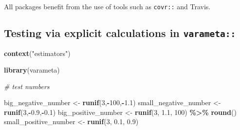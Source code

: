 \documentclass[
]{article}
\newenvironment{Shaded}{\begin{snugshade}}{\end{snugshade}}
\newcommand{\CommentTok}[1]{\textcolor[rgb]{0.56,0.35,0.01}{\textit{#1}}}
\newcommand{\DecValTok}[1]{\textcolor[rgb]{0.00,0.00,0.81}{#1}}
\newcommand{\FloatTok}[1]{\textcolor[rgb]{0.00,0.00,0.81}{#1}}
\newcommand{\KeywordTok}[1]{\textcolor[rgb]{0.13,0.29,0.53}{\textbf{#1}}}
\newcommand{\NormalTok}[1]{#1}
\newcommand{\OperatorTok}[1]{\textcolor[rgb]{0.81,0.36,0.00}{\textbf{#1}}}
\newcommand{\StringTok}[1]{\textcolor[rgb]{0.31,0.60,0.02}{#1}}
\begin{document}
All packages benefit from the use of tools such as \texttt{covr::} and Travis.

\hypertarget{testing-via-explicit-calculations-in-varameta}{%
\subsection{\texorpdfstring{Testing via explicit calculations in \texttt{varameta::}}{Testing via explicit calculations in varameta::}}\label{testing-via-explicit-calculations-in-varameta}}

\begin{Shaded}
\begin{Highlighting}[]
\KeywordTok{context}\NormalTok{(}\StringTok{"estimators"}\NormalTok{)}

\KeywordTok{library}\NormalTok{(varameta)}

\CommentTok{\# test numbers}

\NormalTok{big\_negative\_number <{-}}\StringTok{ }\KeywordTok{runif}\NormalTok{(}\DecValTok{3}\NormalTok{,}\OperatorTok{{-}}\DecValTok{100}\NormalTok{,}\OperatorTok{{-}}\FloatTok{1.1}\NormalTok{)}
\NormalTok{small\_negative\_number <{-}}\StringTok{ }\KeywordTok{runif}\NormalTok{(}\DecValTok{3}\NormalTok{,}\OperatorTok{{-}}\FloatTok{0.9}\NormalTok{,}\OperatorTok{{-}}\FloatTok{0.1}\NormalTok{)}
\NormalTok{big\_positive\_number <{-}}\StringTok{ }\KeywordTok{runif}\NormalTok{(}\DecValTok{3}\NormalTok{, }\FloatTok{1.1}\NormalTok{, }\DecValTok{100}\NormalTok{) }\OperatorTok{\%>\%}\StringTok{ }\KeywordTok{round}\NormalTok{()}
\NormalTok{small\_positive\_number <{-}}\StringTok{ }\KeywordTok{runif}\NormalTok{(}\DecValTok{3}\NormalTok{, }\FloatTok{0.1}\NormalTok{, }\FloatTok{0.9}\NormalTok{)}


\end{Highlighting}
\end{Shaded}
\end{document}
